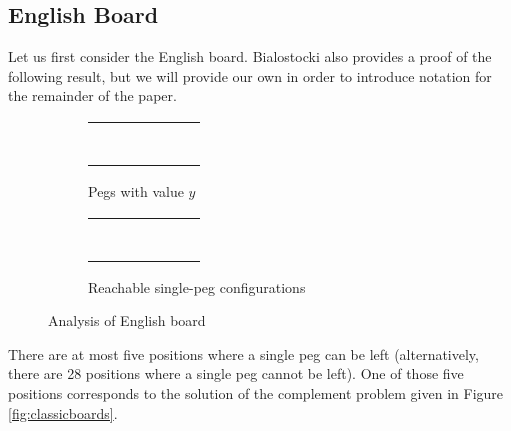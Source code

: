 \documentclass[11pt]{article}
\newenvironment{claim}[1]{\par\noindent{\bfseries Claim.}\space#1}{}
\newcommand*\cir[1]{
  \begin{tikzpicture}[baseline]
    \node[draw,circle,inner sep=0pt,minimum size=12pt,anchor=center](C){#1};
  \end{tikzpicture}}
\newcommand*\h{\cir{}}
\newcommand*\p{
  \begin{tikzpicture}[baseline]
    \node[draw,circle,inner sep=0pt,minimum size=12pt,anchor=center](C){};
    \node[fill=black,circle,inner sep=0pt,minimum size=5pt,anchor=center](C){};
  \end{tikzpicture}}
\begin{document}
\subsection{English Board}
Let us first consider the English board. Bialostocki also provides a proof of the following result, but we will provide our own in order to introduce notation for the remainder of the paper.

\begin{figure}[h]
\centering
\begin{subfigure}{.5\textwidth}
\centering
\begin{tabular}{m{3pt} m{3pt} m{3pt} m{3pt} m{3pt} m{3pt} m{3pt}}
   &    & \h & \p & \h &    & \\
   &    & \p & \h & \h &    & \\
\h & \p & \h & \h & \p & \h & \h \\
\p & \h & \h & \p & \h & \h & \p \\
\h & \h & \p & \h & \h & \p & \h \\
   &    & \h & \h & \p &    & \\
   &    & \h & \p & \h &    & \\
\end{tabular}
\caption{Pegs with value $y$}\label{subfig:englishanalysis:a}
\end{subfigure}%
\begin{subfigure}{.5\textwidth}
\centering
\begin{tabular}{m{3pt} m{3pt} m{3pt} m{3pt} m{3pt} m{3pt} m{3pt}}
   &    & \h & \p & \h &    & \\
   &    & \h & \h & \h &    & \\
\h & \h & \h & \h & \h & \h & \h \\
\p & \h & \h & \p & \h & \h & \p \\
\h & \h & \h & \h & \h & \h & \h \\
   &    & \h & \h & \h &    & \\
   &    & \h & \p & \h &    & \\
\end{tabular}
\caption{Reachable single-peg configurations}\label{subfig:englishanalysis:b}
\end{subfigure}
\caption{Analysis of English board}
\label{fig:englishanalysis}
\end{figure}

\begin{claim}
There are at most five positions where a single peg can be left (alternatively, there are 28 positions where a single peg cannot be left). One of those five positions corresponds to the solution of the complement problem given in Figure \ref{fig:classicboards}.
\end{claim}
\end{document}
